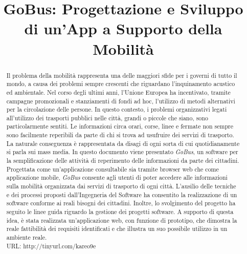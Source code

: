 \documentclass[conference]{IEEEtran}
\begin{document}
\title{GoBus: Progettazione e Sviluppo di un\rq App a Supporto della Mobilit\`{a}}

\author{}


\maketitle


\begin{abstract}
Il problema della mobilit\`{a} rappresenta una delle maggiori sfide per i governi di tutto il mondo, a causa dei problemi sempre crescenti che riguardano l\rq inquinamento acustico ed ambientale. Nel corso degli ultimi anni, l\rq Unione Europea ha incentivato, tramite campagne promozionali e stanziamenti di fondi ad hoc, l\rq utilizzo di metodi alternativi per la circolazione delle persone. In questo contesto, i problemi organizzativi legati all\rq utilizzo dei trasporti pubblici nelle citt\`{a}, grandi o piccole che siano, sono particolarmente sentiti. Le informazioni circa orari, corse, linee e fermate non sempre sono facilmente reperibili da parte di chi si trova ad usufruire dei servizi di trasporto. La naturale conseguenza \`{e} rappresentata da disagi di ogni sorta di cui quotidianamente si parla sui mass media. In questo documento viene presentato \emph{GoBus}, un software per la semplificazione delle attivit\`{a} di reperimento delle informazioni da parte dei cittadini. Progettata come un\rq applicazione consultabile sia tramite browser web che come applicazione mobile, \emph{GoBus} consente agli utenti di poter accedere alle informazioni sulla mobilit\`{a} organizzata dai servizi di trasporto di ogni citt\`{a}. L\rq ausilio delle tecniche e dei processi proposti dall\rq Ingegneria del Software ha consentito la realizzazione di un software conforme ai reali bisogni dei cittadini. Inoltre, lo svolgimento del progetto ha seguito le linee guida riguardo la gestione dei progetti software. A supporto di questa idea, \`{e} stata realizzata un\rq applicazione web, con funzione di prototipo, che dimostra la reale fattibilit\`{a} dei requisiti identificati e che illustra un suo possibile utilizzo in un ambiente reale.\\
URL: http://tinyurl.com/kareo9e
\end{abstract}
\end{document}

